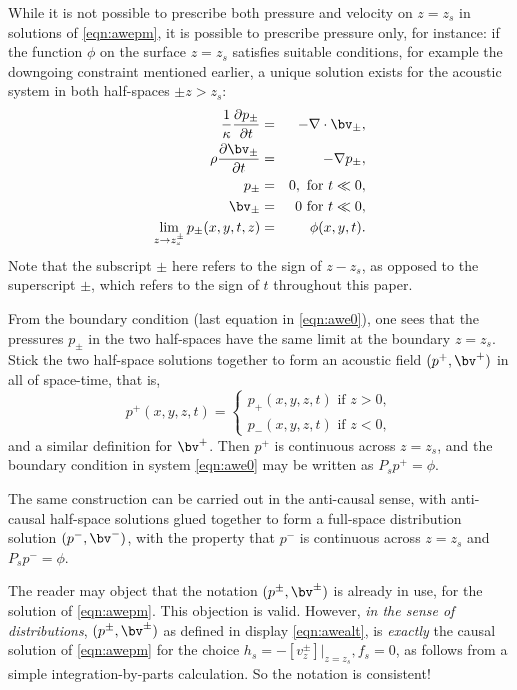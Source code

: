 While it is not possible to prescribe both pressure and velocity on
$z=z_s$ in solutions of \ref{eqn:awepm}, it is possible to
prescribe pressure only, for instance: if the function $\phi$ on
the surface $z=z_s$ satisfies suitable conditions, for
example the downgoing constraint mentioned earlier, a unique solution
exists for the acoustic system in both half-spaces $\pm z > z_s$:
\begin{eqnarray}
\label{eqn:awe0}
  \frac{1}{\kappa}\frac{\partial p_{\pm}}{\partial t} & = & - \nabla \cdot \bv_{\pm}, \nonumber \\
  \rho\frac{\partial \bv_{\pm}}{\partial t} & = & - \nabla
                                                    p_{\pm}, \nonumber \\
  p_{\pm} & =& 0,  \mbox{ for } t \ll 0, \nonumber\\ 
  \bv_{\pm} & = & 0 \mbox{ for } t \ll 0, \nonumber\\
  \lim_{z \rightarrow z_s^{\pm}}p_{\pm}(x,y,t,z)& =& \phi(x,y,t).
\end{eqnarray}
Note that the subscript $\pm$ here refers to the sign of $z-z_s$, as opposed
to the superscript ${\pm}$, which refers to the sign of $t$ throughout
this paper.

From the boundary condition (last equation in \ref{eqn:awe0}), one
sees that the pressures $p_{\pm}$ in the two half-spaces have the same
limit at the boundary $z=z_s$. Stick the two half-space
solutions together to form an acoustic field $(p^+,\bv^+)$ in all of
space-time, that is,
\begin{equation}
  \label{eqn:awealt}
  p^+(x,y,z,t) =
  \left\{
    \begin{array}{c}
      p_+(x,y,z,t) \mbox{ if } z>0,\\
      p_-(x,y,z,t) \mbox{ if } z<0,
    \end{array}
  \right.
\end{equation}
and a similar definition for $\bv^+$. Then $p^+$ is continuous across
$z=z_s$, and the boundary condition in system \ref{eqn:awe0} may be
written as $P_sp^+=\phi$.

The same construction can be carried out in the anti-causal sense,
with anti-causal half-space solutions glued together to form a
full-space distribution solution $(p^-,\bv^-)$, with the property that
$p^-$ is continuous across $z=z_s$ and $P_sp^-=\phi$.

The reader may object that the notation $(p^\pm,\bv^\pm)$ is already in
use, for the solution of \ref{eqn:awepm}. This objection is
valid. However, {\em in the sense
  of distributions}, $(p^{\pm},\bv^{\pm})$ as defined in display
\ref{eqn:awealt}, is {\em exactly} the causal solution of \ref{eqn:awepm}
for the choice $h_s = -[v^{\pm}_{z}]|_{z=z_s}, f_s=0$, as follows from a
simple integration-by-parts calculation. So the notation is consistent!

